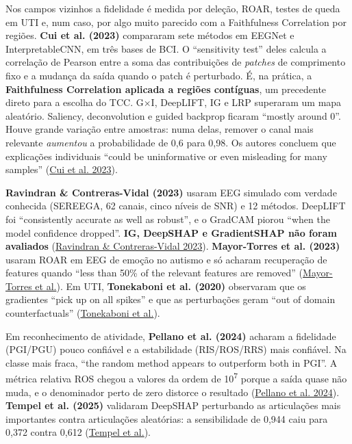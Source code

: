 \documentclass[11pt,a4paper]{article}
\begin{document}
Nos campos vizinhos a fidelidade é medida por deleção, ROAR, testes de queda em UTI e, num caso, por algo muito parecido com a Faithfulness Correlation por regiões. \textbf{Cui et al. (2023)} compararam sete métodos em EEGNet e InterpretableCNN, em três bases de BCI. O ``sensitivity test'' deles calcula a correlação de Pearson entre a soma das contribuições de \textit{patches} de comprimento fixo e a mudança da saída quando o patch é perturbado. É, na prática, a \textbf{Faithfulness Correlation aplicada a regiões contíguas}, um precedente direto para a escolha do TCC. G×I, DeepLIFT, IG e LRP superaram um mapa aleatório. Saliency, deconvolution e guided backprop ficaram ``mostly around 0''. Houve grande variação entre amostras: numa delas, remover o canal mais relevante \textit{aumentou} a probabilidade de 0,6 para 0,98. Os autores concluem que explicações individuais ``could be uninformative or even misleading for many samples'' (\href{https://www.frontiersin.org/journals/computational-neuroscience/articles/10.3389/fncom.2023.1232925/full}{Cui et al. 2023}).

\textbf{Ravindran \& Contreras-Vidal (2023)} usaram EEG simulado com verdade conhecida (SEREEGA, 62 canais, cinco níveis de SNR) e 12 métodos. DeepLIFT foi ``consistently accurate as well as robust'', e o GradCAM piorou ``when the model confidence dropped''. \textbf{IG, DeepSHAP e GradientSHAP não foram avaliados} (\href{https://pmc.ncbi.nlm.nih.gov/articles/PMC10584975/}{Ravindran \& Contreras-Vidal 2023}). \textbf{Mayor-Torres et al. (2023)} usaram ROAR em EEG de emoção no autismo e só acharam recuperação de features quando ``less than 50\% of the relevant features are removed'' (\href{https://arxiv.org/abs/2111.13208v6}{Mayor-Torres et al.}). Em UTI, \textbf{Tonekaboni et al. (2020)} observaram que os gradientes ``pick up on all spikes'' e que as perturbações geram ``out of domain counterfactuals'' (\href{https://proceedings.nips.cc/paper_files/paper/2020/file/08fa43588c2571ade19bc0fa5936e028-Paper.pdf}{Tonekaboni et al.}).

Em reconhecimento de atividade, \textbf{Pellano et al. (2024)} acharam a fidelidade (PGI/PGU) pouco confiável e a estabilidade (RIS/ROS/RRS) mais confiável. Na classe mais fraca, ``the random method appears to outperform both in PGI''. A métrica relativa ROS chegou a valores da ordem de 10\textsuperscript{7} porque a saída quase não muda, e o denominador perto de zero distorce o resultado (\href{https://arxiv.org/pdf/2402.12790}{Pellano et al. 2024}). \textbf{Tempel et al. (2025)} validaram DeepSHAP perturbando as articulações mais importantes contra articulações aleatórias: a sensibilidade de 0,944 caiu para 0,372 contra 0,612 (\href{https://arxiv.org/html/2411.03714}{Tempel et al.}).
\end{document}
